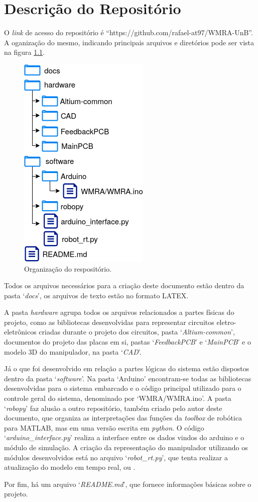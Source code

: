 
\chapter{Descrição do Repositório}

\label{Anexo-Repositorio}

O \textit{link} de acesso do repositório é ``https://github.com/rafael-at97/WMRA-UnB''. A 
oganização do mesmo, indicando principais arquivos e diretórios pode ser vista na figura
\ref{fig:repositorio}.

\begin{figure}[h]
    \caption{Organização do respositório.}    

    \begin{centering}
        \includegraphics[width=0.3\columnwidth]{images/anexo/repositorio.png} 
    \par\end{centering}

    \label{fig:repositorio}
\end{figure}

Todos os arquivos necessários para a criação deste documento estão dentro da pasta `\textit{docs}',
os arquivos de texto estão no formato LATEX.

A pasta \textit{hardware} agrupa todos os arquivos relacionados a partes físicas do projeto,
como as bibliotecas desenvolvidas para representar circuitos eletro-eletrônicos criadas
durante o projeto dos circuitos, pasta `\textit{Altium-common}', documentos do projeto das 
placas em si, pastas `\textit{FeedbackPCB}' e `\textit{MainPCB}' e o modelo 3D do manipulador, na 
pasta `\textit{CAD}'.

Já o que foi desenvolvido em relação a partes lógicas do sistema estão dispostos dentro da pasta
`\textit{software}'. Na pasta `Arduino' encontram-se todas as bibliotecas desenvolvidas para o 
sistema embarcado e o código principal utilizado para o controle geral do sistema, denominado
por `WMRA/WMRA.ino'. A pasta `\textit{robopy}' faz alusão a outro repositório, também criado pelo
autor deste documento, que organiza as interpretações das funções da \textit{toolbox} de robótica
para MATLAB, mas em uma versão escrita em \textit{python}. O código `\textit{arduino\_interface.py}'
realiza a interface entre os dados vindos do arduino e o módulo de simulação. A criação da representação
do manipulador utilizando os módulos desenvolvidos está no arquivo `\textit{robot\_rt.py}', que tenta 
realizar a atualização do modelo em tempo real, ou .

Por fim, há um arquivo `\textit{README.md}', que fornece informações básicas sobre o projeto.

